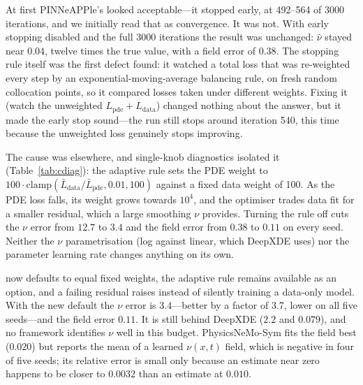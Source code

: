 \documentclass[11pt]{article}
\newcommand{\code}[1]{\protect\path{#1}\xspace}
\newcommand{\fit}[1]{\resizebox{\ifdim\width>\linewidth\linewidth\else\width\fi}{!}{#1}}
\begin{document}
At first PINNeAPPle's \code{InversePINN} looked acceptable---it stopped early, at 492--564 of 3000
iterations, and we initially read that as convergence. It was not. With early stopping disabled and
the full 3000 iterations the result was unchanged: $\hat\nu$ stayed near $0.04$, twelve times the
true value, with a field error of $0.38$. The stopping rule itself was the first defect found: it
watched a total loss that was re-weighted every step by an exponential-moving-average balancing
rule, on fresh random collocation points, so it compared losses taken under different weights.
Fixing it (watch the unweighted $L_{\mathrm{pde}}+L_{\mathrm{data}}$) changed nothing about the
answer, but it made the early stop sound---the run still stops around iteration 540, this time
because the unweighted loss genuinely stops improving.

The cause was elsewhere, and single-knob diagnostics isolated it (Table~\ref{tab:cdiag}): the
adaptive rule sets the PDE weight to $100\cdot\mathrm{clamp}(\bar L_{\mathrm{data}}/\bar
L_{\mathrm{pde}},0.01,100)$ against a fixed data weight of 100. As the PDE loss falls, its weight
grows towards $10^4$, and the optimiser trades data fit for a smaller residual, which a large
smoothing $\nu$ provides. Turning the rule off cuts the $\nu$ error from $12.7$ to $3.4$ and the
field error from $0.38$ to $0.11$ on every seed. Neither the $\nu$ parametrisation (log against
linear, which DeepXDE uses) nor the parameter learning rate changes anything on its own.

\begin{table}[t]
\centering\small
\fit{}
\caption{Track~C diagnostics: one knob of the PINNeAPPle recipe changed at a time, early stopping
off, 3000 iterations. These rows are diagnostics, not tuning, and are not presented as PINNeAPPle's
result.}
\label{tab:cdiag}
\end{table}

\code{InversePINN} now defaults to equal fixed weights, the adaptive rule remains available as an
option, and a failing residual raises instead of silently training a data-only model. With the new
default the $\nu$ error is $3.4$---better by a factor of 3.7, lower on all five seeds---and the field
error $0.11$. It is still behind DeepXDE ($2.2$ and $0.079$), and no framework identifies $\nu$ well
in this budget. PhysicsNeMo-Sym fits the field best ($0.020$) but reports the mean of a learned
$\nu(x,t)$ field, which is negative in four of five seeds; its relative error is small only because
an estimate near zero happens to be closer to $0.0032$ than an estimate at $0.010$.
\end{document}
